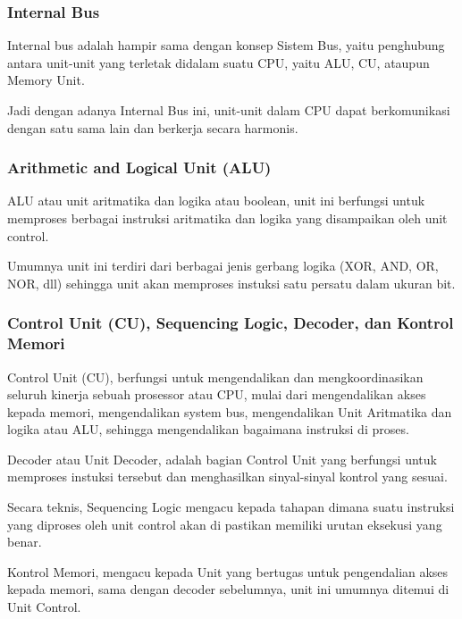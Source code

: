 \documentclass[12pt,a4paper]{article}
\begin{document}
    \subsubsection*{Internal Bus}

      Internal bus adalah hampir sama dengan konsep Sistem Bus,
      yaitu penghubung antara unit-unit yang terletak didalam suatu CPU,
      yaitu ALU, CU, ataupun Memory Unit.

      Jadi dengan adanya Internal Bus ini, unit-unit dalam CPU dapat berkomunikasi
      dengan satu sama lain dan berkerja secara harmonis.

    \subsubsection*{Arithmetic and Logical Unit (ALU)}

      ALU atau unit aritmatika dan logika atau boolean, unit ini berfungsi
      untuk memproses berbagai instruksi aritmatika dan logika yang
      disampaikan oleh unit control.

      Umumnya unit ini terdiri dari berbagai jenis gerbang logika
      (XOR, AND, OR, NOR, dll) sehingga unit akan memproses instuksi satu persatu
      dalam ukuran bit.

    \subsubsection*{Control Unit (CU), Sequencing Logic, Decoder, dan Kontrol Memori}

      Control Unit (CU), berfungsi untuk mengendalikan dan mengkoordinasikan
      seluruh kinerja sebuah prosessor atau CPU, mulai dari mengendalikan akses
      kepada memori, mengendalikan system bus, mengendalikan Unit Aritmatika dan
      logika atau ALU, sehingga mengendalikan bagaimana instruksi di proses.

      Decoder atau Unit Decoder, adalah bagian Control Unit yang berfungsi
      untuk memproses instuksi tersebut dan menghasilkan sinyal-sinyal kontrol
      yang sesuai.

      Secara teknis, Sequencing Logic mengacu kepada tahapan dimana suatu
      instruksi yang diproses oleh unit control akan di pastikan memiliki urutan
      eksekusi yang benar.

      Kontrol Memori, mengacu kepada Unit yang bertugas untuk pengendalian akses
      kepada memori, sama dengan decoder sebelumnya, unit ini umumnya ditemui
      di Unit Control.
\end{document}
